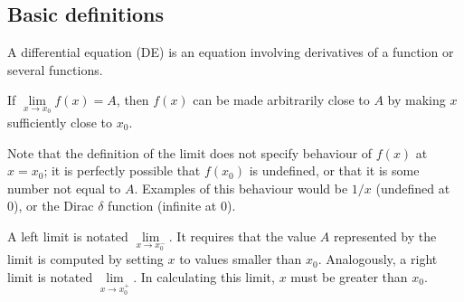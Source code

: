 \subsection{Basic definitions}
\begin{definition}
	A differential equation (DE) is an equation involving derivatives of a function or several functions.
\end{definition}
\begin{definition}
	If \(\lim\limits_{x \to x_0} f(x) = A\), then \(f(x)\) can be made arbitrarily close to \(A\) by making \(x\) sufficiently close to \(x_0\).
\end{definition}
Note that the definition of the limit does not specify behaviour of \(f(x)\) at \(x=x_0\); it is perfectly possible that \(f(x_0)\) is undefined, or that it is some number not equal to \(A\).
Examples of this behaviour would be \(1/x\) (undefined at 0), or the Dirac \(\delta\) function (infinite at 0).

\begin{definition}
	A left limit is notated \(\lim\limits_{x \to x_0^-}\).
	It requires that the value \(A\) represented by the limit is computed by setting \(x\) to values smaller than \(x_0\).
	Analogously, a right limit is notated \(\lim\limits_{x \to x_0^+}\).
	In calculating this limit, \(x\) must be greater than \(x_0\).
\end{definition}

\begin{center}
\end{center}

